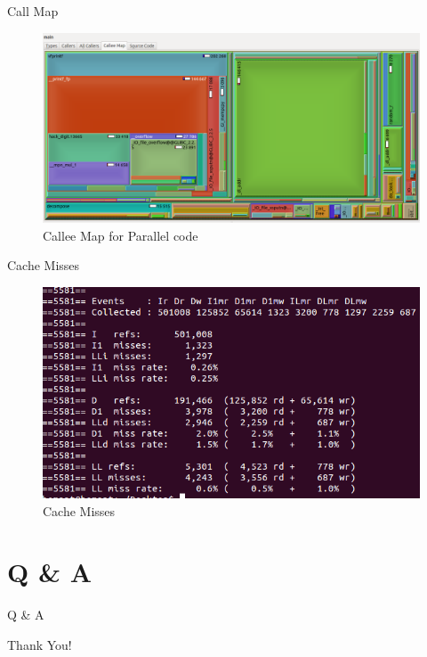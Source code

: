 \documentclass{beamer}
\begin{document}
\begin{frame}{Call Map}
\begin{figure}[htp]
\centering
\includegraphics[scale=.2]{call.png}
\caption{Callee Map for Parallel code}
\end{figure}
\end{frame}


\begin{frame}{Cache Misses}
\begin{figure}[htp]
\centering
\includegraphics[scale=.4]{cache.png}
\caption{Cache Misses}
\end{figure}
\end{frame}


\section{Q \& A}
\begin{frame}{Q \& A}
\begin{center}
Thank You!
\end{center}
\end{frame}
\end{document}
